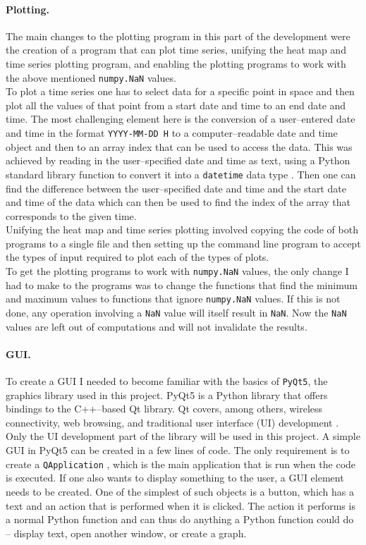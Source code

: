 \documentclass[../00_main.tex]{subfiles}
\begin{document}
\paragraph{Plotting.}

The main changes to the plotting program in this part of the development were
the creation of a program that can plot time series, unifying the heat map and
time series plotting program, and enabling the plotting programs to work with
the above mentioned \texttt{numpy.NaN} values.\\
To plot a time series one has to select data for a specific point in space and
then plot all the values of that point from a start date and time to an end
date and time. The most challenging element here is the conversion of
a user--entered date and time in the format \texttt{YYYY-MM-DD H} to
a computer--readable date and time object and then to an array index that can be
used to access the data. This was achieved by reading in the user--specified
date and time as text, using a Python standard library function to convert it
into a \texttt{datetime} data type \cite{py-datetime}. Then one can find the difference between
the user--specified date and time and the start date and time of the data which
can then be used to find the index of the array that corresponds to the given
time. \\
Unifying the heat map and time series plotting involved copying the code of
both programs to a single file and then setting up the command line program to
accept the types of input required to plot each of the types of plots.\\
To get the plotting programs to work with \texttt{numpy.NaN} values, the only
change I had to make to the programs was to change the functions that find the
minimum and maximum values to functions that ignore \texttt{numpy.NaN} values.
If this is not done, any operation involving a \texttt{NaN} value will itself
result in \texttt{NaN}. Now the \texttt{NaN} values are left out of
computations and will not invalidate the results.

\paragraph{GUI.}

To create a GUI I needed to become familiar with the basics of \texttt{PyQt5},
the graphics library used in this project. PyQt5 is a Python library that
offers bindings to the C++--based Qt library. Qt covers, among others, wireless 
connectivity, web browsing, and traditional user interface (UI) development
\cite{pyqt}. 
Only the UI development part of the library will be used in this project.
A simple GUI in PyQt5 can be created in a few lines of code. The only
requirement is to create a \texttt{QApplication} \cite{pyqt-ref}, which is the main application
that is run when the code is executed. If one also wants to display something
to the user, a GUI element needs to be created. One of the simplest of such
objects
is a button, which has a text and an action that is performed when it is
clicked. The action it performs is a normal Python function and can thus do
anything a Python function could do -- display text, open another window, or
create a graph.
\end{document}
